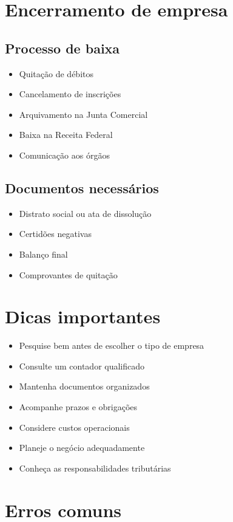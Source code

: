 \documentclass[12pt,a4paper]{article}
\begin{document}
\section{Encerramento de empresa}

\subsection{Processo de baixa}
\begin{itemize}
    \item Quitação de débitos
    \item Cancelamento de inscrições
    \item Arquivamento na Junta Comercial
    \item Baixa na Receita Federal
    \item Comunicação aos órgãos
\end{itemize}

\subsection{Documentos necessários}
\begin{itemize}
    \item Distrato social ou ata de dissolução
    \item Certidões negativas
    \item Balanço final
    \item Comprovantes de quitação
\end{itemize}

\section{Dicas importantes}

\begin{itemize}
    \item Pesquise bem antes de escolher o tipo de empresa
    \item Consulte um contador qualificado
    \item Mantenha documentos organizados
    \item Acompanhe prazos e obrigações
    \item Considere custos operacionais
    \item Planeje o negócio adequadamente
    \item Conheça as responsabilidades tributárias
\end{itemize}

\section{Erros comuns}
\end{document}
